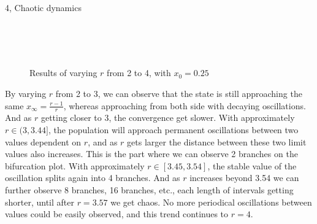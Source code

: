 \documentclass[10pt,a4paper]{article}
\begin{document}
\begin{task}{4, Chaotic dynamics}
\begin{figure} [H]
    \centering
    \\
    \\
    \\
    \caption{Results of varying $r$ from 2 to 4, with $x_0=0.25$}
    \label{fig:task4-1-2}
\end{figure}

By varying $r$ from 2 to 3, we can observe that the state is still approaching the same $x_\infty=\frac{r-1}{r}$, whereas approaching from both side with decaying oscillations. And as $r$ getting closer to 3, the convergence get slower. With approximately $r\in(3, 3.44]$, the population will approach permanent oscillations between two values dependent on $r$, and as $r$ gets larger the distance between these two limit values also increases. This is the part where we can observe 2 branches on the bifurcation plot. With approximately $r\in[3.45, 3.54]$, the stable value of the oscillation splits again into 4 branches. And as $r$ increases beyond 3.54 we can further observe 8 branches, 16 branches, etc., each length of intervals getting shorter, until after $r=3.57$ we get chaos. No more periodical oscillations between values could be easily observed, and this trend continues to $r=4$.


\end{task}
\end{document}
